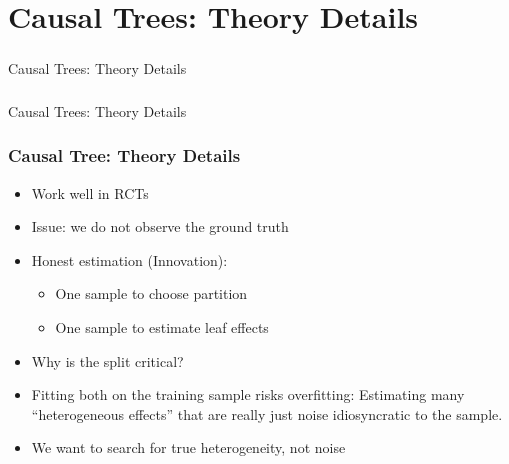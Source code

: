 \documentclass[
  shownotes,
  xcolor={svgnames},
  hyperref={colorlinks,citecolor=DarkBlue,linkcolor=DarkRed,urlcolor=DarkBlue}
  , aspectratio=169]{beamer}
\begin{document}
\section{Causal Trees: Theory Details}
\begin{frame}[fragile]
\frametitle{}


\centering
{\huge \textcolor{andesred}{Causal Trees: Theory Details}}



\end{frame}

\begin{frame}[fragile]
\frametitle{}


\centering
{\huge \textcolor{andesred}{Causal Trees: Theory Details}}



\end{frame}

\begin{frame}[fragile]
\frametitle{Causal Tree: Theory Details}



\begin{itemize}
  \item Work well in RCTs
  \medskip
  \item Issue: we do not observe the ground truth
  \medskip
  \item Honest estimation (Innovation):
    \begin{itemize}
      \item One sample to choose partition 
      \medskip
      \item One sample to estimate leaf effects
      \medskip
    \end{itemize}
  \item Why is the split critical?
  \medskip
  \item Fitting both on the training sample risks overfitting: Estimating many “heterogeneous effects” that are really just noise idiosyncratic to the sample.
  \medskip
  \item We want to search for true heterogeneity, not noise
\end{itemize}

\end{frame}
\end{document}
